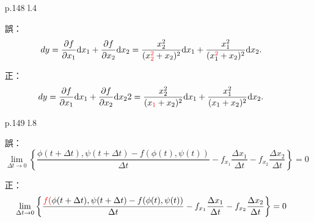 \documentclass[pdflatex,ja=standard,a4paper]{bxjsarticle}
\newcommand{\dif}{\mathrm{d}}
\begin{document}
\begin{enumerate}
\item[p.148 l.4]
\item[誤：] 
$$dy=\frac{\partial f}{\partial x_1}\dif x_1+\frac{\partial f}{\partial x_2}\dif x_2=
\frac{x_2^2}{(x_{\textcolor{red}{2}}^{\textcolor{red}{2}}+x_2)^2}\dif x_1+
\frac{x_1^2}{(x_1^{\textcolor{red}{2}}+x_2)^2}\dif x_2.$$
\item[正：] 
$$dy=\frac{\partial f}{\partial x_1}\dif x_1+\frac{\partial f}{\partial x_2}\dif x_2
2=
\frac{x_2^2}{(x_{\textcolor{red}{1}}+x_2)^2}\dif x_1+
\frac{x_1^2}{(x_1+x_2)^2}\dif x_2.$$
\item[p.149 l.8]
\item[誤：] 
$$\lim_{\Delta t\to0}
\left\{
\frac{\phi(t+\Delta t),\psi(t+\Delta t)-f(\phi(t),\psi(t))}{\Delta t}-f_{x_1}\frac{\Delta x_1}{\Delta t}-f_{x_2}\frac{\Delta x_2}{\Delta t}
\right\}=0$$
\item[正：] 
$$\lim_{\Delta t\to0}
\left\{
\frac{\textcolor{red}{f(}\phi(t+\Delta t),\psi(t+\Delta t)-f(\phi(t),\psi(t))}{\Delta t}-f_{x_1}\frac{\Delta x_1}{\Delta t}-f_{x_2}\frac{\Delta x_2}{\Delta t}
\right\}=0$$
\end{enumerate}
\end{document}
